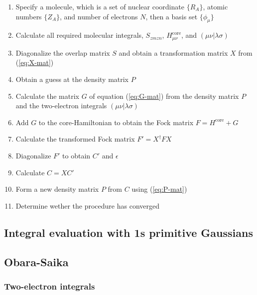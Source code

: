 \documentclass[11pt]{article}
\begin{document}
\begin{enumerate}
\item Specify a molecule, which is a set of nuclear coordinate \(\{R_A\}\), atomic numbers \(\{Z_A\}\), and number of electrons \(N\), then a basis set \(\{\phi_{\mu}\}\)

\item Calculate all required molecular integrals, \(S_{zmzn}\), \(H_{\mu\nu}^{\text{core}}\), and \((\mu\nu|\lambda\sigma)\)

\item Diagonalize the overlap matrix \(S\) and obtain a transformation matrix \(X\) from (\ref{eq:X-mat})

\item Obtain a guess at the density matrix \(P\)

\item Calculate the matrix \(G\) of equation (\ref{eq:G-mat}) from the density matrix \(P\) and the two-electron integrals \((\mu\nu|\lambda\sigma)\)

\item Add \(G\) to the core-Hamiltonian to obtain the Fock matrix \(F = H^{\text{core}} + G\)

\item Calculate the transformed Fock matrix \(F' = X^{\dagger}FX\)

\item Diagonalize \(F'\) to obtain \(C'\) and \(\epsilon\)

\item Calculate \(C= X C'\)

\item Form a new density matrix \(P\) from \(C\) using (\ref{eq:P-mat})

\item Determine wether the procedure has converged
\end{enumerate}
\subsection{Integral evaluation with 1s primitive Gaussians}
\label{sec:orgf72c074}

\subsection{Obara-Saika}
\label{sec:org89261be}

\subsubsection{Two-electron integrals}
\label{sec:org5a91fd2}
\end{document}
